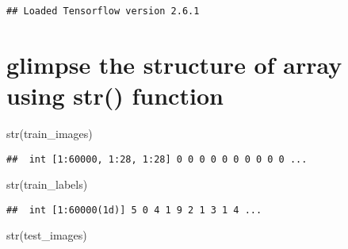 \documentclass[]{article}
\newenvironment{Shaded}{\begin{snugshade}}{\end{snugshade}}
\newcommand{\FunctionTok}[1]{\textcolor[rgb]{0.00,0.00,0.00}{#1}}
\newcommand{\NormalTok}[1]{#1}
\newcommand{\OtherTok}[1]{\textcolor[rgb]{0.56,0.35,0.01}{#1}}
\newcommand{\SpecialCharTok}[1]{\textcolor[rgb]{0.00,0.00,0.00}{#1}}
\begin{document}
\begin{verbatim}
## Loaded Tensorflow version 2.6.1
\end{verbatim}

\begin{Shaded}
\end{Shaded}

\hypertarget{glimpse-the-structure-of-array-using-str-function}{%
\section{glimpse the structure of array using str()
function}\label{glimpse-the-structure-of-array-using-str-function}}

\begin{Shaded}
\begin{Highlighting}[]
\FunctionTok{str}\NormalTok{(train\_images)}
\end{Highlighting}
\end{Shaded}

\begin{verbatim}
##  int [1:60000, 1:28, 1:28] 0 0 0 0 0 0 0 0 0 0 ...
\end{verbatim}

\begin{Shaded}
\begin{Highlighting}[]
\FunctionTok{str}\NormalTok{(train\_labels)}
\end{Highlighting}
\end{Shaded}

\begin{verbatim}
##  int [1:60000(1d)] 5 0 4 1 9 2 1 3 1 4 ...
\end{verbatim}

\begin{Shaded}
\begin{Highlighting}[]
\FunctionTok{str}\NormalTok{(test\_images)}
\end{Highlighting}
\end{Shaded}
\end{document}
